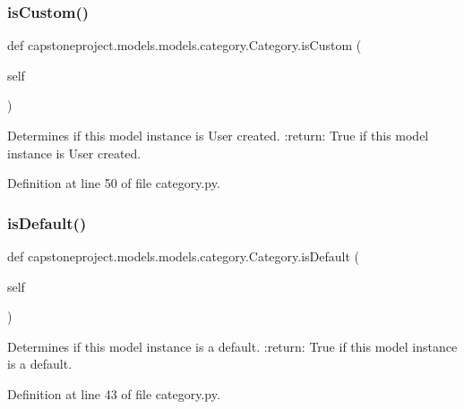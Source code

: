 \subsubsection{\texorpdfstring{is\+Custom()}{isCustom()}}
{\footnotesize\ttfamily def capstoneproject.\+models.\+models.\+category.\+Category.\+is\+Custom (\begin{DoxyParamCaption}\item[{}]{self }\end{DoxyParamCaption})}

\begin{DoxyVerb}Determines if this model instance is User created.
:return: True if this model instance is User created.
\end{DoxyVerb}
 

Definition at line 50 of file category.\+py.

\mbox{\label{classcapstoneproject_1_1models_1_1models_1_1category_1_1_category_af1932495f6574ea8cfabc3ce40e9b8d0}} 
\subsubsection{\texorpdfstring{is\+Default()}{isDefault()}}
{\footnotesize\ttfamily def capstoneproject.\+models.\+models.\+category.\+Category.\+is\+Default (\begin{DoxyParamCaption}\item[{}]{self }\end{DoxyParamCaption})}

\begin{DoxyVerb}Determines if this model instance is a default.
:return: True if this model instance is a default.
\end{DoxyVerb}
 

Definition at line 43 of file category.\+py.

\mbox{\label{classcapstoneproject_1_1models_1_1models_1_1category_1_1_category_a08f12b4c20d985a0a1b57491d73463e6}} 
